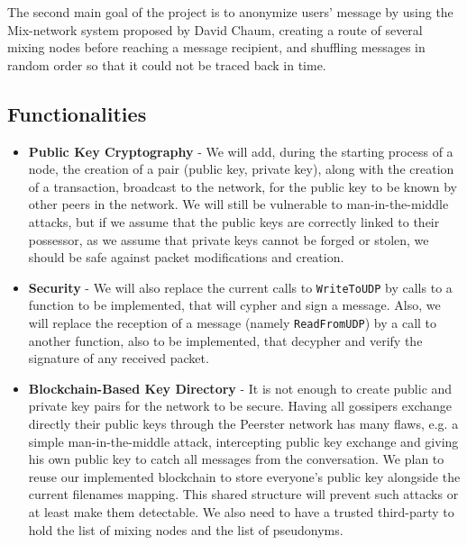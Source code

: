 \documentclass[11pt, a4paper]{article}
\begin{document}
        The second main goal of the project is to anonymize users' message by using the Mix-network system proposed by David Chaum\cite{chaum84}, creating a route of several mixing nodes before reaching a message recipient, and shuffling messages in random order so that it could not be traced back in time.

    \subsection{Functionalities}\label{subsec:functionalities}

        \begin{itemize}

        \item \textbf{Public Key Cryptography} -
        We will add, during the starting process of a node, the creation of a pair (public key, private key), along with the creation of a transaction, broadcast to the network, for the public key to be known by other peers in the network.
        We will still be vulnerable to man-in-the-middle attacks, but if we assume that the public keys are correctly linked to their possessor, as we assume that private keys cannot be forged or stolen, we should be safe against packet modifications and creation.

        \item \textbf{Security} - We will also replace the current calls to \texttt{WriteToUDP} by calls to a function to be implemented, that will cypher and sign a message. Also, we will replace the reception of a message (namely \texttt{ReadFromUDP}) by a call to another function, also to be implemented, that decypher and verify the signature of any received packet.

        \item \textbf{Blockchain-Based Key Directory} -
        It is not enough to create public and private key pairs for the network to be secure.
        Having all gossipers exchange directly their public keys through the Peerster network has many flaws, e.g. a simple man-in-the-middle attack, intercepting public key exchange and giving his own public key to catch all messages from the conversation.
        We plan to reuse our implemented blockchain to store everyone's public key alongside the current filenames mapping. This shared structure will prevent such attacks or at least make them detectable.
        We also need to have a trusted third-party to hold the list of mixing nodes and the list of pseudonyms.


\end{itemize}
\end{document}
